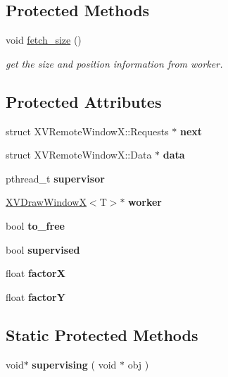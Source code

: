 \subsection*{Protected Methods}
\begin{CompactItemize}
\item 
\label{XVRemoteWindowX_b0}
\hypertarget{class_XVRemoteWindowX_b0}{
void \hyperlink{class_XVRemoteWindowX_b0}{fetch\_\-size} ()}

\begin{CompactList}\small\item\em get the size and position information from worker.\item\end{CompactList}\end{CompactItemize}
\subsection*{Protected Attributes}
\begin{CompactItemize}
\item 
\label{XVRemoteWindowX_n0}
\hypertarget{class_XVRemoteWindowX_n0}{
struct XVRemote\-Window\-X::Requests $\ast$ {\bf next}}

\item 
\label{XVRemoteWindowX_n1}
\hypertarget{class_XVRemoteWindowX_n1}{
struct XVRemote\-Window\-X::Data $\ast$  {\bf data}}

\item 
pthread\_\-t {\bf supervisor}
\item 
\hyperlink{class_XVDrawWindowX}{XVDraw\-Window\-X}$<$T$>$$\ast$ {\bf worker}
\item 
bool {\bf to\_\-free}
\item 
bool {\bf supervised}
\item 
float {\bf factor\-X}
\item 
float {\bf factor\-Y}
\end{CompactItemize}
\subsection*{Static Protected Methods}
\begin{CompactItemize}
\item 
\label{XVRemoteWindowX_e0}
\hypertarget{class_XVRemoteWindowX_e0}{
void$\ast$ {\bf supervising} ( void $\ast$ obj )}

\end{CompactItemize}
